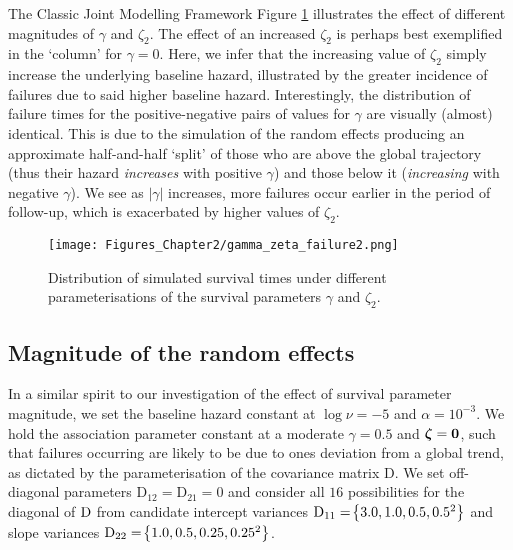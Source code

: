 \begin{chapter}{\label{cha:methods-classic}The Classic Joint Modelling Framework}
  Figure \ref{fig:sim-gammazeta} illustrates the effect of different magnitudes of $\gamma$ and $\zeta_2$. The effect of an increased $\zeta_2$ is perhaps best exemplified in the `column' for $\gamma = 0$. Here, we infer that the increasing value of $\zeta_2$ simply increase the underlying baseline hazard, illustrated by the greater incidence of failures due to said higher baseline hazard. Interestingly, the distribution of failure times for the positive-negative pairs of values for $\gamma$ are visually (almost) identical. This is due to the simulation of the random effects producing an approximate half-and-half `split' of those who are above the global trajectory (thus their hazard \textit{increases} with positive $\gamma$) and those below it (\textit{increasing} with negative $\gamma$). We see as $|\gamma|$ increases, more failures occur earlier in the period of follow-up, which is exacerbated by higher values of $\zeta_2$.
  \begin{figure}[t]
    \centering
    \texttt{[image: Figures\_Chapter2/gamma\_zeta\_failure2.png]}
    \caption{Distribution of simulated survival times under different parameterisations of the survival parameters $\gamma$ and $\zeta_2$.}
  \label{fig:sim-gammazeta}
  \end{figure}
  
  \subsection{Magnitude of the random effects}\label{sec:sim-considerations-D}
  In a similar spirit to our investigation of the effect of survival parameter magnitude, we set the baseline hazard constant at $\log\nu=-5$ and $\alpha=10^{-3}$. We hold the association parameter constant at a moderate $\gamma = 0.5$ and $\bm{\zeta}=\bm{0}$, such that failures occurring are likely to be due to ones deviation from a global trend, as dictated by the parameterisation of the covariance matrix $\mathrm{D}$. We set off-diagonal parameters $\mathrm{D}_{12}=\mathrm{D}_{21}=0$ and consider all $16$ possibilities for the diagonal of $\mathrm{D}$ from candidate intercept variances $\mathrm{D}_{11} = \!\left\{3.0, 1.0, 0.5, 0.5^2\right\}$ and slope variances $\mathrm{D}_{22} = \!\left\{1.0, 0.5, 0.25, 0.25^2\right\}$.
  

\end{chapter}
